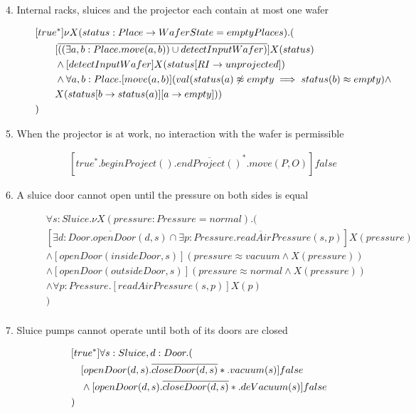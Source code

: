 \begin{description}
 
 \item[4. Internal racks, sluices and the projector each contain at most one wafer]
    
\begin{align*}
		&[true^*] \nu X(status:Place \to WaferState=emptyPlaces).(\\
  & \tab\tab [\overline{((\exists a,b:Place.move(a,b)) \cup detectInputWafer)}]X(status)\\
  & \tab\tab  \wedge [detectInputWafer]X(status[RI \to unprojected])\\
  & \tab\tab  \wedge \forall a,b:Place.[move(a, b)](val(status(a) \not \approx empty \implies status(b)  \approx empty) \wedge \\ & \tab \tab X(status[b \to status(a)][a \to empty]))\\
&)
	\end{align*}

 
 \item[5. When the projector is at work, no interaction with the wafer is permissible]
 	\begin{align*}
 		&[true^*.beginProject().\overline{endProject()}^*.move(P,O)]false
	\end{align*}
	
 \item[6. A sluice door cannot open until the pressure on both sides is equal]
	\begin{align*}
& \forall s: Sluice . \nu X(pressure: Pressure = normal) . ( \\
&   [\overline{\exists d: Door . openDoor(d, s)} \cap \overline{\exists p: Pressure . readAirPressure(s, p)}]X(pressure) \\
&   \wedge [openDoor(insideDoor, s)](pressure \approx vacuum \wedge X(pressure)) \\
&   \wedge [openDoor(outsideDoor, s)](pressure \approx normal \wedge X(pressure)) \\
&   \wedge \forall p: Pressure . [readAirPressure(s, p)]X(p) \\
& ) \\
	\end{align*}
	
 \item[7. Sluice pumps cannot operate until both of its doors are closed]
 
 \begin{align*}
 &[true^*]\forall s:Sluice, d:Door . ( \\
 &\hspace{1em} [openDoor(d,s).\overline{closeDoor(d,s)}*.vacuum(s)]false \\
 &\hspace{1em} \wedge [openDoor(d,s).\overline{closeDoor(d,s)}*.deVacuum(s)]false \\
 &)
 \end{align*}


\end{description}
